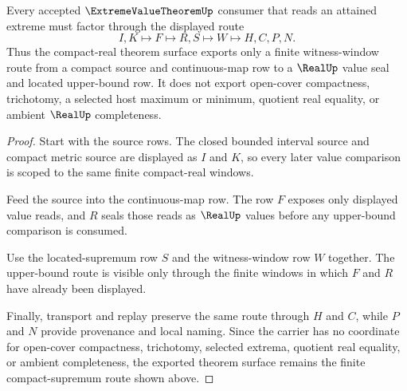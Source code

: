 \begin{theorem}
\label{thm:extreme-value-theorem-compact-supremum-route}
Every accepted $\ExtremeValueTheoremUp$ consumer that reads an attained extreme must factor through the displayed route
$$
I,K \longmapsto F \longmapsto R,S \longmapsto W \longmapsto H,C,P,N .
$$
Thus the compact-real theorem surface exports only a finite witness-window route from a compact source and continuous-map row to a $\RealUp$ value seal and located upper-bound row. It does not export open-cover compactness, trichotomy, a selected host maximum or minimum, quotient real equality, or ambient $\RealUp$ completeness.
\end{theorem}
\begin{proof}
Start with the source rows. The closed bounded interval source and compact metric source are displayed as $I$ and $K$, so every later value comparison is scoped to the same finite compact-real windows.

Feed the source into the continuous-map row. The row $F$ exposes only displayed value reads, and $R$ seals those reads as $\RealUp$ values before any upper-bound comparison is consumed.

Use the located-supremum row $S$ and the witness-window row $W$ together. The upper-bound route is visible only through the finite windows in which $F$ and $R$ have already been displayed.

Finally, transport and replay preserve the same route through $H$ and $C$, while $P$ and $N$ provide provenance and local naming. Since the carrier has no coordinate for open-cover compactness, trichotomy, selected extrema, quotient real equality, or ambient completeness, the exported theorem surface remains the finite compact-supremum route shown above.
\end{proof}



